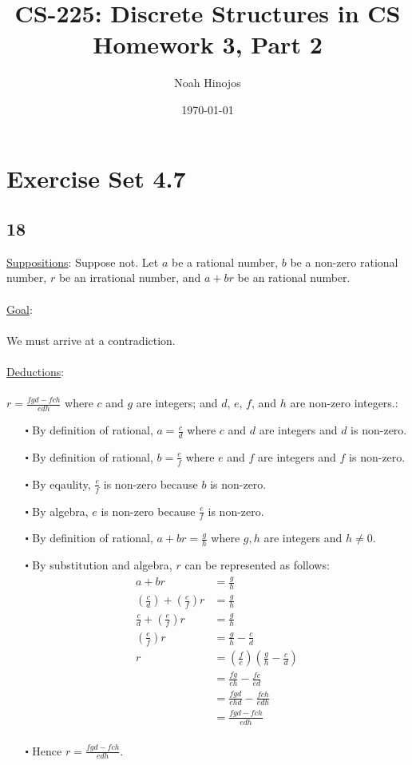 \documentclass[12pt]{article}
\title{
  \textbf{CS-225: Discrete Structures in CS} \\
  Homework 3, Part 2
  }
\author{Noah Hinojos}
\date{\today}
\begin{document}
\maketitle

\section*{Exercise Set 4.7}
\subsection*{18}
\underline{Suppositions}:
Suppose not. Let $a$ be a rational number, $b$ be a non-zero rational number,
$r$ be an irrational number, and $a+br$ be an rational number.
\\ \\
\underline{Goal}:
\\ \\
We must arrive at a contradiction.
\\ \\
\underline{Deductions}:
\\ \\
$r= \frac{fgd - fch}{edh}$ where $c$ and $g$ are integers; and $d$, $e$, $f$, and $h$ are non-zero integers.:
\begin{itemize}
  \item [$\centerdot$] By definition of rational, $a = \frac{c}{d}$ where $c$ and $d$ are integers and $d$ is non-zero. 
  \item [$\centerdot$] By definition of rational, $b = \frac{e}{f}$ where $e$ and $f$ are integers and $f$ is non-zero.
  \item [$\centerdot$] By eqaulity, $\frac{e}{f}$ is non-zero because $b$ is non-zero.
  \item [$\centerdot$] By algebra, $e$ is non-zero because $\frac{e}{f}$ is non-zero.
  \item [$\centerdot$] By definition of rational, $a+br = \frac{g}{h}$ where $g,h$ are integers and $h \neq 0$.
  \item [$\centerdot$] By substitution and algebra, $r$ can be represented as follows:
  \begin{align*}
    a+br &= \frac{g}{h} \\
    \left(\frac{c}{d}\right) + \left(\frac{e}{f}\right)r &= \frac{g}{h}\\
    \frac{c}{d} + \left(\frac{e}{f}\right)r &= \frac{g}{h}\\
    \left(\frac{e}{f}\right)r &= \frac{g}{h} - \frac{c}{d} \\
    r &= \left(\frac{f}{e}\right)\left(\frac{g}{h} - \frac{c}{d}\right)  \\
    &= \frac{fg}{eh} - \frac{fc}{ed} \\
    &= \frac{fgd}{ehd} - \frac{fch}{edh} \\
    &= \frac{fgd - fch}{edh} \\
  \end{align*}
  \item [$\centerdot$] Hence $r = \frac{fgd - fch}{edh}$.
\end{itemize}
\end{document}

